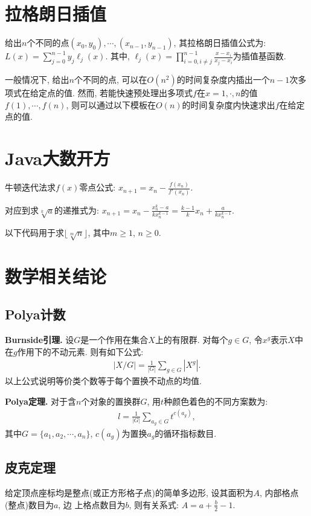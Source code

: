 \section{拉格朗日插值}
给出$n$个不同的点$(x_0,y_0), \cdots, (x_{n−1}, y_{n−1})$, 其拉格朗日插值公式为:
$L(x) = \sum_{j=0}^{n-1}y_j \ell_j(x)$.
其中, $\ell_j(x) = \prod_{i=0,i\ne j}^{n-1} \frac{x-x_i}{x_j-x_i}$为插值基函数.

一般情况下, 给出$n$个不同的点, 可以在$O(n^2)$的时间复杂度内插出一个$n−1$次多项式在给定点的值.
然而, 若能快速预处理出多项式$f$在$x = 1, \cdot, n$的值$f(1), \cdots, f(n)$, 则可以通过以下模板在$O(n)$的时间复杂度内快速求出$f$在给定点的值.


\section{Java大数开方}
牛顿迭代法求$f(x)$零点公式: $x_{n+1} = x_n - \frac{f(x_n)}{f'(x_n)}$.

对应到求$\sqrt[k]{a}$的递推式为: $x_{n+1} = x_n - \frac{x^k_n - a}{k x^{k-1}_n} = \frac{k-1}{k}x_n + \frac{a}{k x^{k-1}_n}$.

以下代码用于求$\lfloor \sqrt[m]{n} \rfloor$, 其中$m\geq 1$, $n\geq 0$.


\section{数学相关结论}

\subsection{Polya计数}

\textbf{Burnside引理.}
设$G$是一个作用在集合$X$上的有限群.
对每个$g \in G$, 令$x^g$表示$X$中在$g$作用下的不动元素.
则有如下公式:
\begin{gather*}
    |X/G|={\frac{1}{|G|}}\sum_{{g\in G}}{|X^{g}|}.
\end{gather*}
以上公式说明等价类个数等于每个置换不动点的均值.

\textbf{Polya定理.}
对于含$n$个对象的置换群$G$, 用$t$种颜色着色的不同方案数为:
\begin{gather*}
    l={\frac {1}{|G|}}\sum _{{a_g\in G}}t^{{c(a_{g})}},
\end{gather*}
其中$G = \{a_1, a_2, \cdots, a_n\}$, $c(a_g)$为置换$a_g$的循环指标数目.


\subsection{皮克定理}
给定顶点座标均是整点(或正方形格子点)的简单多边形, 设其面积为$A$, 内部格点(整点)数目为$a$, 边
上格点数目为$b$, 则有关系式: $A = a + \frac{b}{2} - 1$.

